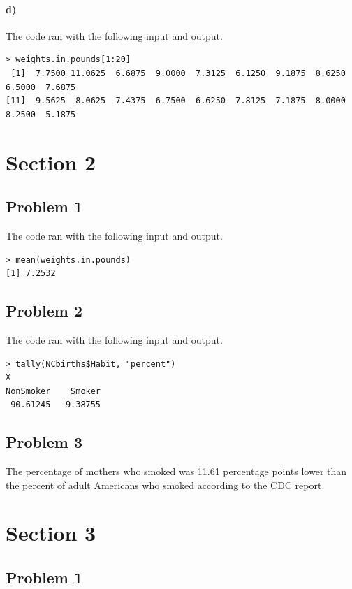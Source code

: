\documentclass[12pt]{article}
\begin{document}
\paragraph{d)}

The code ran with the following input and output.
\scriptsize
\begin{verbatim}
> weights.in.pounds[1:20]
 [1]  7.7500 11.0625  6.6875  9.0000  7.3125  6.1250  9.1875  8.6250  6.5000  7.6875
[11]  9.5625  8.0625  7.4375  6.7500  6.6250  7.8125  7.1875  8.0000  8.2500  5.1875
\end{verbatim}
\normalsize

\section*{Section 2}

\subsection*{Problem 1}

The code ran with the following input and output.
\begin{verbatim}
> mean(weights.in.pounds)
[1] 7.2532
\end{verbatim}

\subsection*{Problem 2}

The code ran with the following input and output.
\begin{verbatim}
> tally(NCbirths$Habit, "percent")
X
NonSmoker    Smoker
 90.61245   9.38755
\end{verbatim}

\subsection*{Problem 3}

The percentage of mothers who smoked was 11.61 percentage points lower than the percent of adult
Americans who smoked according to the CDC report.

\section*{Section 3}

\subsection*{Problem 1}
\end{document}
